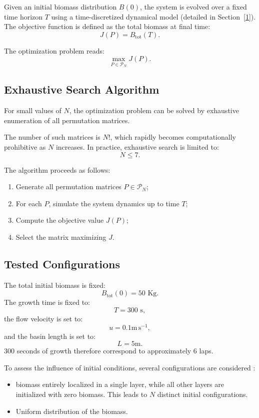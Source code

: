 \documentclass{article}
\begin{document}
Given an initial biomass distribution $B(0)$, the system is evolved over a fixed time horizon $T$ 
using a time-discretized dynamical model (detailed in Section~\ref{1}). 
The objective function is defined as the total biomass at final time:
\[
J(P) = B_{\text{tot}}(T).
\]

The optimization problem reads:
\[
\max_{P \in \mathcal{P}_N} J(P).
\]

\subsection{Exhaustive Search Algorithm}

For small values of $N$, the optimization problem can be solved by exhaustive enumeration 
of all permutation matrices.

The number of such matrices is $N!$, which rapidly becomes computationally prohibitive 
as $N$ increases. In practice, exhaustive search is limited to:
\[
N \leq \text{7}.
\]

The algorithm proceeds as follows:
\begin{enumerate}
    \item Generate all permutation matrices $P \in \mathcal{P}_N$;
    \item For each $P$, simulate the system dynamics up to time $T$;
    \item Compute the objective value $J(P)$;
    \item Select the matrix maximizing $J$.
\end{enumerate}

\subsection{Tested Configurations}

The total initial biomass is fixed:
\[
B_{\text{tot}}(0) = \text{50 Kg}.
\]
The growth time is fixed to:
\[
T = \text{300 s},
\]
the flow velocity is set to:
\[
u = \text{0.1} \mathrm{m\, s^{-1}},
\]
and the basin length is set to:
\[
L = \text{5} \mathrm{m}.
\]
300 seconds of growth therefore correspond to approximately 6 laps.

To assess the influence of initial conditions, several configurations are considered :

\begin{itemize}
\item biomass entirely localized in a single layer, while all other layers are initialized with zero biomass.
This leads to $N$ distinct initial configurations.
\item Uniform distribution of the biomass.
\end{itemize}
\end{document}

